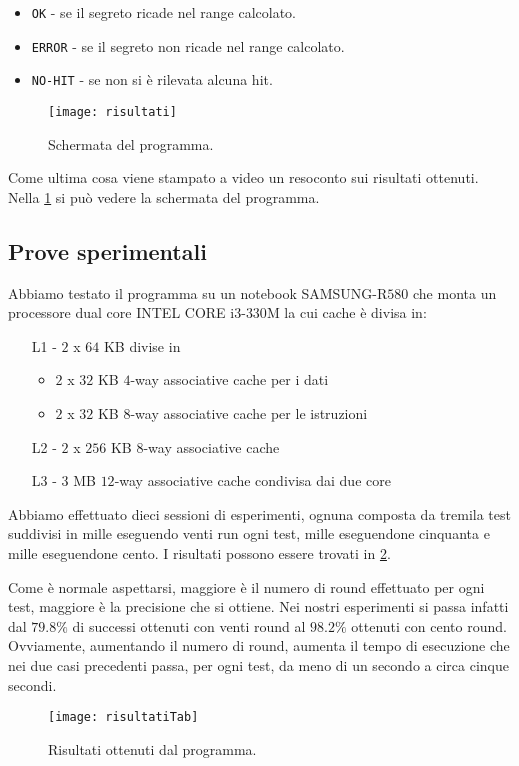 				\begin{itemize}
					\item \texttt{OK} - se il segreto ricade nel range calcolato.
					\item \texttt{ERROR} - se il segreto non ricade nel range calcolato.
					\item \texttt{NO-HIT} - se non si è rilevata alcuna hit.
				\end{itemize}
			
				\begin{figure}
					\begin{center}
						\texttt{[image: risultati]}
						\caption[Schermata di SPARK]{Schermata del programma.}
						\label{fig:schermata}
					\end{center}
				\end{figure}
				
				Come ultima cosa viene stampato a video un resoconto sui risultati ottenuti. Nella \cref{fig:schermata} si può vedere la schermata del programma.
			
			\subsection{Prove sperimentali}
				Abbiamo testato il programma su un notebook SAMSUNG-R$580$ che monta un processore dual core INTEL CORE i$3$-$330$M la cui cache è divisa in:
				\begin{itemize}
					\item [L1 -] $2$ x $64$ KB divise in 
					\begin{itemize}
						\item  $2$ x $32$ KB $4$-way associative cache per i dati
						\item  $2$ x $32$ KB $8$-way associative cache per le istruzioni
					\end{itemize}
					\item[L2 -] $2$ x $256$ KB $8$-way associative cache
					\item[L3 -] $3$ MB $12$-way associative cache condivisa dai due core
				\end{itemize}
			
				Abbiamo effettuato dieci sessioni di esperimenti, ognuna composta da tremila test suddivisi in mille eseguendo venti run ogni test, mille eseguendone cinquanta e mille eseguendone cento. I risultati possono essere trovati in \cref{fig:risultati}.
				
				Come è normale aspettarsi, maggiore è il numero di round effettuato per ogni test, maggiore è la precisione che si ottiene. Nei nostri esperimenti si passa infatti dal $79.8\%$ di successi ottenuti con venti round al $98.2\%$ ottenuti con cento round. Ovviamente, aumentando il numero di round, aumenta il tempo di esecuzione che nei due casi precedenti passa, per ogni test, da meno di un secondo a circa cinque secondi.
			
				\begin{figure}
					\begin{center}
						\texttt{[image: risultatiTab]}
						\caption[Risultati SPARK]{Risultati ottenuti dal programma.}
						\label{fig:risultati}
					\end{center}
				\end{figure}
					